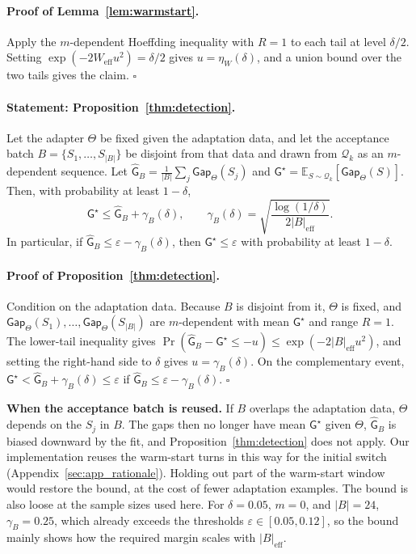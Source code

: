 {\paragraph{Proof of Lemma~\ref{lem:warmstart}.}
Apply the $m$-dependent Hoeffding inequality with $R=1$ to each tail at level $\delta/2$. Setting $\exp(-2W_{\mathrm{eff}}u^2)=\delta/2$ gives $u=\eta_W(\delta)$, and a union bound over the two tails gives the claim.
\hfill$\square$

\paragraph{Statement: Proposition~\ref{thm:detection}.}
Let the adapter $\Theta$ be fixed given the adaptation data, and let the acceptance batch $B=\{S_1,\ldots,S_{|B|}\}$ be disjoint from that data and drawn from $\mathcal Q_k$ as an $m$-dependent sequence. Let $\widehat{\mathsf G}_B=\frac1{|B|}\sum_{j}\mathsf{Gap}_{\Theta}(S_j)$ and $\mathsf G^\star=\mathbb E_{S\sim\mathcal Q_k}[\mathsf{Gap}_{\Theta}(S)]$. Then, with probability at least $1-\delta$,
\[
\mathsf G^\star\le\widehat{\mathsf G}_B+\gamma_B(\delta),\qquad \gamma_B(\delta)=\sqrt{\frac{\log(1/\delta)}{2|B|_{\mathrm{eff}}}} .
\]
In particular, if $\widehat{\mathsf G}_B\le\varepsilon-\gamma_B(\delta)$, then $\mathsf G^\star\le\varepsilon$ with probability at least $1-\delta$.

\paragraph{Proof of Proposition~\ref{thm:detection}.}
Condition on the adaptation data. Because $B$ is disjoint from it, $\Theta$ is fixed, and $\mathsf{Gap}_{\Theta}(S_1),\ldots,\mathsf{Gap}_{\Theta}(S_{|B|})$ are $m$-dependent with mean $\mathsf G^\star$ and range $R=1$. The lower-tail inequality gives $\Pr(\widehat{\mathsf G}_B-\mathsf G^\star\le-u)\le\exp(-2|B|_{\mathrm{eff}}u^2)$, and setting the right-hand side to $\delta$ gives $u=\gamma_B(\delta)$. On the complementary event, $\mathsf G^\star<\widehat{\mathsf G}_B+\gamma_B(\delta)\le\varepsilon$ if $\widehat{\mathsf G}_B\le\varepsilon-\gamma_B(\delta)$.
\hfill$\square$

\textbf{When the acceptance batch is reused.}
If $B$ overlaps the adaptation data, $\Theta$ depends on the $S_j$ in $B$. The gaps then no longer have mean $\mathsf G^\star$ given $\Theta$, $\widehat{\mathsf G}_B$ is biased downward by the fit, and Proposition~\ref{thm:detection} does not apply. Our implementation reuses the warm-start turns in this way for the initial switch (Appendix~\ref{sec:app_rationale}). Holding out part of the warm-start window would restore the bound, at the cost of fewer adaptation examples. The bound is also loose at the sample sizes used here. For $\delta=0.05$, $m=0$, and $|B|=24$, $\gamma_B=0.25$, which already exceeds the thresholds $\varepsilon\in[0.05,0.12]$, so the bound mainly shows how the required margin scales with $|B|_{\mathrm{eff}}$.

}
